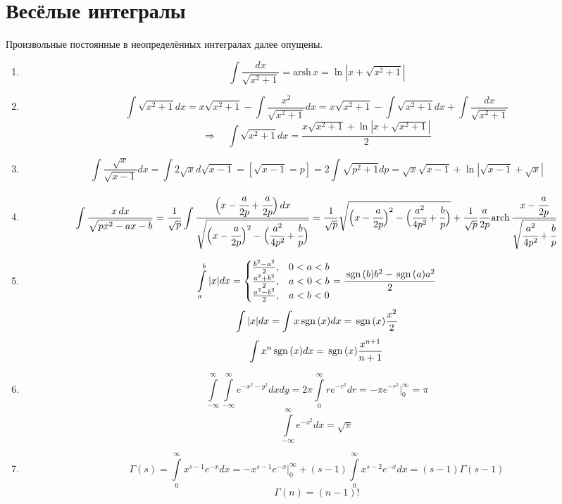 \section{Весёлые интегралы}
Произвольные постоянные в неопределённых интегралах далее опущены.
\begin{enumerate}
	\item 
	\[
		\int \frac{dx}{\sqrt{x^2 + 1}} = \mathrm{arsh\,}x = \ln |x + \sqrt{x^2 + 1}|
	\]
	\item
	\[
		\int \sqrt{x^2 + 1} dx = 
		x \sqrt{x^2 + 1} - \int \frac{x^2}{\sqrt{x^2 + 1}}dx =
		x \sqrt{x^2 + 1} - \int \sqrt{x^2 + 1}dx + \int \frac{dx}{\sqrt{x^2 + 1}}
	\]
	\[
		\Rightarrow \quad
		\int \sqrt{x^2 + 1} dx = \frac{x \sqrt{x^2 + 1} + \ln |x + \sqrt{x^2 + 1}|}{2}
	\]
	\item
	\[
		\int \frac{\sqrt{x}}{\sqrt{x-1}} dx = 
		\int 2 \sqrt{x} d\sqrt{x-1} =
		[\sqrt{x - 1} = p]
		= 2 \int \sqrt{p^2 + 1} dp = 
		\sqrt{x} \sqrt{x-1}+ \ln |\sqrt{x - 1} + \sqrt{x}|
	\]
	\item
	\[
		\int \frac{x\,dx}{\sqrt{px^2 - ax - b}} = 
		\frac{1}{\sqrt{p}} \int \frac{\Big(x - \cfrac{a}{2p} + \cfrac{a}{2p}\Big)\,dx}{\sqrt{\Big(x - \cfrac{a}{2p}\Big)^2 - \Big(\cfrac{a^2}{4p^2} + \cfrac{b}{p}\Big)}}
		= \frac{1}{\sqrt{p}} \sqrt{\Big(x - \cfrac{a}{2p}\Big)^2 - \Big(\cfrac{a^2}{4p^2} + \cfrac{b}{p}\Big)} + 
		\frac{1}{\sqrt{p}} \cfrac{a}{2p} \,\mathrm{arch\,} \frac{x - \cfrac{a}{2p}}{\sqrt{\cfrac{a^2}{4p^2} + \cfrac{b}{p}}}
	\]
	\item
	\[
		\int\limits_a^b |x| dx = 
		\begin{cases}
		\frac{b^2 - a^2}{2}, & 0 < a < b \\
		\frac{a^2 + b^2}{2}, & a < 0 < b \\
		\frac{a^2 - b^2}{2}, & a < b < 0
		\end{cases}
		=
		\frac{\mathrm{\,sgn}\,(b) b^2 - \mathrm{\,sgn}\,(a) a^2}{2}
	\]
	\[
		\int |x| dx = \int x \mathrm{\,sgn}\, (x) dx = \mathrm{\,sgn}\, (x) \frac{x^2}{2}
	\]
	\[
		\int x^n \mathrm{\,sgn}\, (x) dx = \mathrm{\,sgn}\, (x) \frac{x^{n+1}}{n + 1}
	\]
	\item
	\[
		\int\limits_{-\infty}^\infty\int\limits_{-\infty}^\infty e^{-x^2 - y^2} dx dy =
		2\pi \int\limits_0^\infty r e^{-r^2} dr = - \pi e^{-r^2} \Big|_0^\infty = \pi 	
	\]
	\[
		\int\limits_{-\infty}^{\infty} e^{-x^2} dx = \sqrt{\pi}
	\]
	\item 
	\[
		\Gamma(s) = \int\limits_0^\infty x^{s - 1} e^{-x} dx = 
		-x^{s-1} e^{-x} \Big|_0^\infty + (s - 1) \int\limits_0^\infty x^{s - 2} e^{-x} dx = (s - 1) \Gamma (s - 1)
	\]
	\[
		\Gamma(n) = (n - 1)!
	\]

\end{enumerate}
